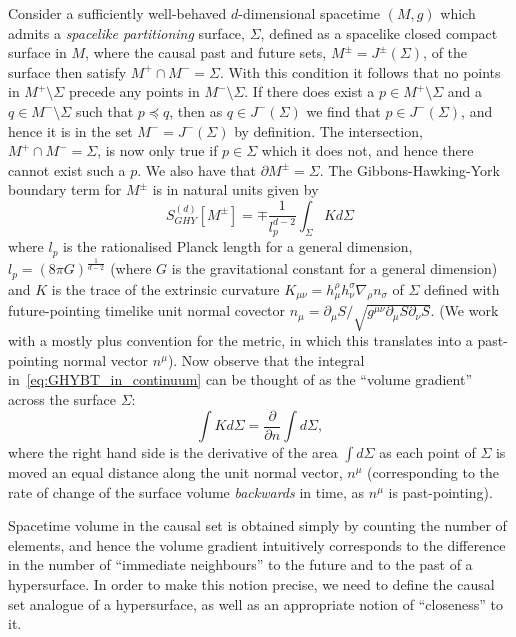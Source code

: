 \documentclass[12pt]{article}
\newcommand{\be}{\begin{equation}}
\newcommand{\ee}{\end{equation}}
\begin{document}
Consider a sufficiently well-behaved $d$-dimensional spacetime $(M,g)$ which admits a \emph{spacelike partitioning} surface, $\Sigma$, defined as a spacelike closed compact surface in $M$, where the causal past and future sets, $M^\pm=J^\pm (\Sigma)$, of the surface then satisfy $M^+\cap M^-=\Sigma$. With this condition it follows that no points in $M^+\setminus\Sigma$ precede any points in $M^-\setminus\Sigma$. If there does exist a $p\in M^+\setminus\Sigma$ and a $q\in M^-\setminus\Sigma$ such that $p\preceq q$, then as $q\in J^-(\Sigma)$ we find that $p\in J^-(\Sigma)$, and hence it is in the set $M^-=J^-(\Sigma)$ by definition. The intersection, $M^+\cap M^-=\Sigma$, is now only true if $p\in\Sigma$ which it does not, and hence there cannot exist such a $p$.  We also have that $\partial M^\pm = \Sigma$. The Gibbons-Hawking-York boundary term for $M^\pm$ is in natural units given by
\be\label{eq:GHYBT_in_continuum}
{S}^{(d)}_{GHY}\left[M^\pm\right]= \mp \frac{1}{l_p^{d-2}}\int_{\Sigma} K d\Sigma
\ee
where $l_p$ is the rationalised Planck length for a general dimension, $l_p=(8\pi G)^{\frac{1}{d-2}}$ (where $G$ is the gravitational constant for a general dimension) and $K$ is the trace of the extrinsic curvature $K_{\mu\nu}=h_{\mu}^\rho h_\nu^\sigma \nabla_\rho n_\sigma$ of $\Sigma$ defined with future-pointing timelike unit normal covector $n_{\mu}=\partial_\mu S/\sqrt{g^{\mu\nu}\partial_\mu S\partial_\nu S}$. (We work with a mostly plus convention for the metric, in which this translates into a past-pointing normal vector $n^{\mu}$). Now observe that the integral in~\eqref{eq:GHYBT_in_continuum} can be thought of as the ``volume gradient'' across the surface $\Sigma$:
\be\label{eq:normal_deriv_boundary}
\int K d\Sigma = \frac{\partial}{\partial n}\int d\Sigma,
\ee
where the right hand side is the derivative of the area $\int d\Sigma$ as each point of $\Sigma$ is moved an equal distance along the unit normal vector, $n^{\mu}$ (corresponding to the rate of change of the surface volume \emph{backwards} in time, as $n^{\mu}$ is past-pointing).

Spacetime volume in the causal set is obtained simply by counting the number of elements, and hence the volume gradient intuitively corresponds to the difference in the number of ``immediate neighbours'' to the future and to the past of a hypersurface. In order to make this notion precise, we need to define the causal set analogue of a hypersurface, as well as an appropriate notion of ``closeness'' to it.
\end{document}

